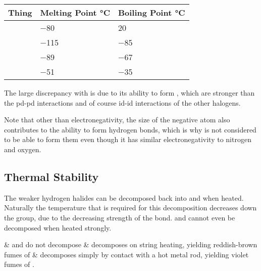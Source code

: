 			\begin{center}\begin{table}[htb]\renewcommand{\arraystretch}{1.5}
			\begin{tabu} to \textwidth {X[c,m] | X[c,m] | X[c,m]}

				Thing		&	Melting Point \si{\celsius}		&	Boiling Point \si{\celsius}	\\	\hline
						&	\num{-80}						&	\num{20}					\\	\hline
					&	\num{-115}						&	\num{-85}					\\	\hline
					&	\num{-89}						&	\num{-67}					\\	\hline
						&	\num{-51}						&	\num{-35}					\\	\hline

			\end{tabu}
			\end{table}\end{center}\vspace{-10mm}

			The large discrepancy with  is due to its ability to form , which are stronger than the pd-pd interactions
			and of course id-id interactions of the other halogens.

			Note that other than electronegativity, the size of the negative atom also contributes to the ability to form hydrogen bonds, which
			is why  is not considered to be able to form them even though it has similar electronegativity to nitrogen and oxygen.





		\subsection{Thermal Stability}

			The weaker hydrogen halides can be decomposed back into  and  when heated. Naturally the temperature that is required
			for this decomposition decreases down the group, due to the decreasing strength of the  bond.
			 and  cannot even be decomposed when heated strongly.

			\begin{bulletlist}
				&  and  do not decompose
				&  decomposes on string heating, yielding reddish-brown fumes of 
				&  decomposes simply by contact with a hot metal rod, yielding violet fumes of .
			\end{bulletlist}

